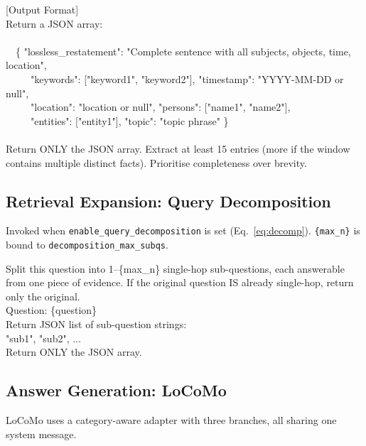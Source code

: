 \begin{tcolorbox}[title={\textbf{Extraction: System + User Prompt}}, breakable, colback=blue!3, colframe=blue!40]
{[Output Format]}\\
Return a JSON array:\\
\lbrack\\
\ \ \{ "lossless\_restatement": "Complete sentence with all subjects, objects, time, location",\\
\ \ \ \ \ "keywords": ["keyword1", "keyword2"], "timestamp": "YYYY-MM-DD or null",\\
\ \ \ \ \ "location": "location or null", "persons": ["name1", "name2"],\\
\ \ \ \ \ "entities": ["entity1"], "topic": "topic phrase" \}\\
\rbrack\\[0.3em]
Return ONLY the JSON array. Extract at least 15 entries (more if the window contains multiple distinct facts). Prioritise completeness over brevity.
\end{tcolorbox}

\subsection{Retrieval Expansion: Query Decomposition}
\label{app:prompt_decompose}

Invoked when \texttt{enable\_query\_decomposition} is set (Eq.~\ref{eq:decomp}). \texttt{\{max\_n\}} is bound to \texttt{decomposition\_max\_subqs}.

\begin{tcolorbox}[title={\textbf{Query Decomposition: User Prompt}}, breakable, colback=violet!3, colframe=violet!40]
\small\ttfamily
Split this question into 1--\{max\_n\} single-hop sub-questions, each answerable from one piece of evidence. If the original question IS already single-hop, return only the original.\\[0.3em]
Question: \{question\}\\[0.3em]
Return JSON list of sub-question strings:\\
\lbrack "sub1", "sub2", ...\rbrack\\[0.3em]
Return ONLY the JSON array.
\end{tcolorbox}

\subsection{Answer Generation: LoCoMo}
\label{app:prompt_answer_locomo}

LoCoMo uses a category-aware adapter with three branches, all sharing one system message.

